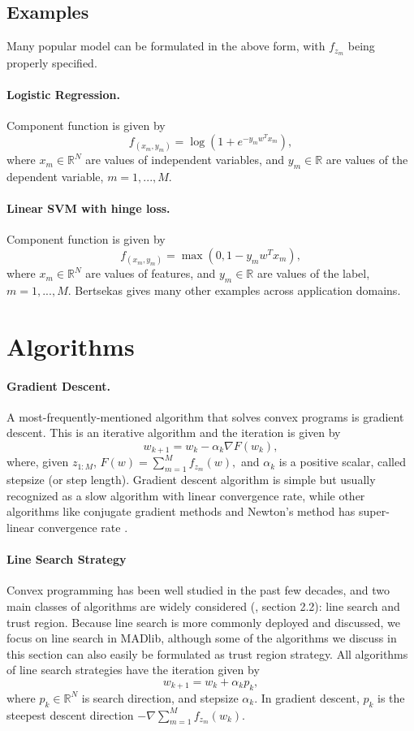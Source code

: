 \subsection{Examples}
Many popular model can be formulated in the above form, with $f_{z_m}$ being properly specified.

\paragraph{Logistic Regression.} Component function is given by
\[f_{(x_m, y_m)} = \log(1 + e^{- y_m w^{T} x_m}),\]
where $x_m \in \mathbb{R}^N$ are values of independent variables, and $y_m \in \mathbb{R}$ are values of the dependent variable, $m = 1,...,M.$

\paragraph{Linear SVM with hinge loss.} Component function is given by
\[f_{(x_m, y_m)} = \max(0, 1 - y_m w^{T} x_m),\]
where $x_m \in \mathbb{R}^N$ are values of features, and $y_m \in \mathbb{R}$ are values of the label, $m = 1,...,M.$
Bertsekas \cite{springerlink:10.1007/s10107-011-0472-0} gives many other examples across application domains.

\section{Algorithms}
\paragraph{Gradient Descent.}
A most-frequently-mentioned algorithm that solves convex programs is gradient descent.
This is an iterative algorithm and the iteration is given by
\[w_{k+1} = w_k - \alpha_k \nabla F(w_k),\]
where, given $z_{1:M}$, $F(w) = \sum_{m=1}^M f_{z_m}(w),$ and $\alpha_k$ is a positive scalar, called stepsize (or step length).
Gradient descent algorithm is simple but usually recognized as a slow algorithm with linear convergence rate, while other algorithms like conjugate gradient methods and Newton's method has super-linear convergence rate \cite{nocedal2006numerical}.

\paragraph{Line Search Strategy}
Convex programming has been well studied in the past few decades, and two main classes of algorithms are widely considered (\cite{nocedal2006numerical}, section 2.2): line search and trust region.
Because line search is more commonly deployed and discussed, we focus on line search in MADlib, although some of the algorithms we discuss in this section can also easily be formulated as trust region strategy.
All algorithms of line search strategies have the iteration given by
\[w_{k+1} = w_k + \alpha_k p_k,\]
where $p_k \in \mathbb{R}^N$ is search direction, and stepsize $\alpha_k$.
In gradient descent, $p_k$ is the steepest descent direction $- \nabla \sum_{m=1}^M f_{z_m}(w_k)$.

